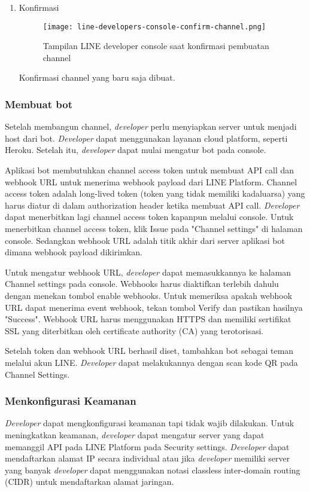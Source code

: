 \begin{enumerate}
\begin{itemize}
\end{itemize}

\item Konfirmasi
\begin{figure}[H]
	\centering  
	\texttt{[image: line-developers-console-confirm-channel.png]}  
	\caption[Tampilan LINE developer console saat konfirmasi pembuatan channel]{Tampilan LINE developer console saat konfirmasi pembuatan channel} 
	\label{fig:line-developers-console-confirm-channel} 
\end{figure}

Konfirmasi channel yang baru saja dibuat.

\end{enumerate}


\subsubsection{Membuat bot}
Setelah membangun channel, \textit{developer} perlu menyiapkan server untuk menjadi host dari bot. \textit{Developer} dapat menggunakan layanan cloud platform, seperti Heroku. Setelah itu, \textit{developer} dapat mulai mengatur bot pada console.

Aplikasi bot membutuhkan channel access token untuk membuat API call dan webhook URL untuk menerima webhook payload dari LINE Platform. Channel access token adalah long-lived token (token yang tidak memiliki kadaluarsa) yang harus diatur di dalam authorization header ketika membuat API call. \textit{Developer} dapat menerbitkan lagi channel access token kapanpun melalui console. Untuk menerbitkan channel access token, klik Issue pada "Channel settings" di halaman console. Sedangkan webhook URL adalah titik akhir dari server aplikasi bot dimana webhook payload dikirimkan.

Untuk mengatur webhook URL, \textit{developer} dapat memasukkannya ke halaman Channel settings pada console. Webhooks harus diaktifkan terlebih dahulu dengan menekan tombol enable webhooks. Untuk memeriksa apakah webhook URL dapat menerima event webhook, tekan tombol Verify dan pastikan hasilnya "Success". Webhook URL harus menggunakan HTTPS dan memiliki sertifikat SSL yang diterbitkan oleh certificate authority (CA) yang terotorisasi.

Setelah token dan webhook URL berhasil diset, tambahkan bot sebagai teman melalui akun LINE. \textit{Developer} dapat melakukannya dengan scan kode QR pada Channel Settings.

\subsubsection{Menkonfigurasi Keamanan}
\textit{Developer} dapat mengkonfigurasi keamanan tapi tidak wajib dilakukan. Untuk meningkatkan keamanan, \textit{developer} dapat mengatur server yang dapat memanggil API pada LINE Platform pada Security settings. \textit{Developer} dapat mendaftarkan alamat IP secara individual atau jika \textit{developer} memiliki server yang banyak \textit{developer} dapat menggunakan notasi classless inter-domain routing (CIDR) untuk mendaftarkan alamat jaringan.

